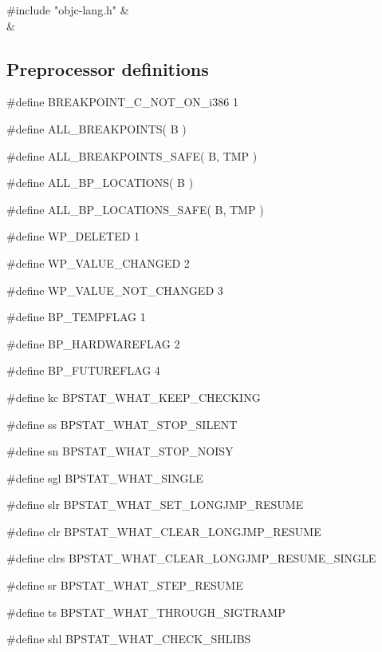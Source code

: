 \medskip
\begin{cxreftabi}
{\stt \#include "objc-lang.h"} &\\
\hspace*{0.2in}{\stt \#include <Availability.h>} &\\
\end{cxreftabi}


\subsection*{Preprocessor definitions}

{\stt \#define BREAKPOINT\_C\_NOT\_ON\_i386 1}

\medskip
{\stt \#define ALL\_BREAKPOINTS( B )}

\medskip
{\stt \#define ALL\_BREAKPOINTS\_SAFE( B, TMP )}

\medskip
{\stt \#define ALL\_BP\_LOCATIONS( B )}

\medskip
{\stt \#define ALL\_BP\_LOCATIONS\_SAFE( B, TMP )}

\medskip
{\stt \#define WP\_DELETED 1}

\medskip
{\stt \#define WP\_VALUE\_CHANGED 2}

\medskip
{\stt \#define WP\_VALUE\_NOT\_CHANGED 3}

\medskip
{\stt \#define BP\_TEMPFLAG 1}

\medskip
{\stt \#define BP\_HARDWAREFLAG 2}

\medskip
{\stt \#define BP\_FUTUREFLAG 4}

\medskip
{\stt \#define kc BPSTAT\_WHAT\_KEEP\_CHECKING}

\medskip
{\stt \#define ss BPSTAT\_WHAT\_STOP\_SILENT}

\medskip
{\stt \#define sn BPSTAT\_WHAT\_STOP\_NOISY}

\medskip
{\stt \#define sgl BPSTAT\_WHAT\_SINGLE}

\medskip
{\stt \#define slr BPSTAT\_WHAT\_SET\_LONGJMP\_RESUME}

\medskip
{\stt \#define clr BPSTAT\_WHAT\_CLEAR\_LONGJMP\_RESUME}

\medskip
{\stt \#define clrs BPSTAT\_WHAT\_CLEAR\_LONGJMP\_RESUME\_SINGLE}

\medskip
{\stt \#define sr BPSTAT\_WHAT\_STEP\_RESUME}

\medskip
{\stt \#define ts BPSTAT\_WHAT\_THROUGH\_SIGTRAMP}

\medskip
{\stt \#define shl BPSTAT\_WHAT\_CHECK\_SHLIBS}

